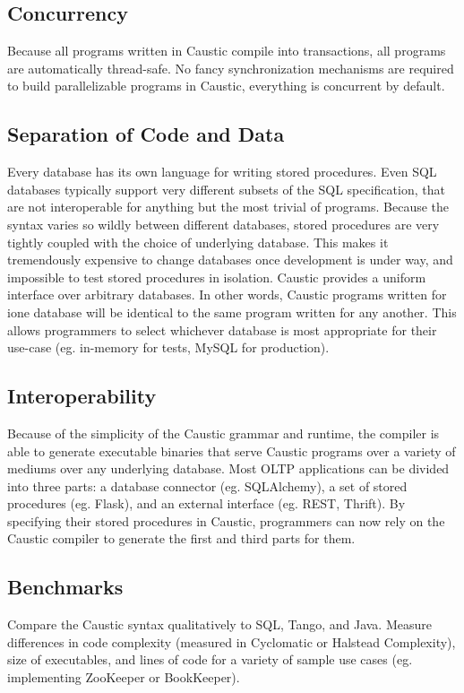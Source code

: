 \documentclass[12pt]{article}
\begin{document}
\subsection{Concurrency}
Because all programs written in Caustic compile into transactions, all programs are automatically thread-safe. No fancy synchronization mechanisms are required to build parallelizable programs in Caustic, everything is concurrent by default.

\subsection{Separation of Code and Data}
Every database has its own language for writing stored procedures. Even SQL databases typically support very different subsets of the SQL specification, that are not interoperable for anything but the most trivial of programs.  Because the syntax varies so wildly between different databases, stored procedures are very tightly coupled with the choice of underlying database. This makes it tremendously expensive to change databases once development is under way, and impossible to test stored procedures in isolation. Caustic provides a uniform interface over arbitrary databases. In other words, Caustic programs written for ione database will be identical to the same program written for any another. This allows programmers to select whichever database is most appropriate for their use-case (eg. in-memory for tests, MySQL for production). 

\subsection{Interoperability}
Because of the simplicity of the Caustic grammar and runtime, the compiler is able to generate executable binaries that serve Caustic programs over a variety of mediums over any underlying database. Most OLTP applications can be divided into three parts: a database connector (eg. SQLAlchemy), a set of stored procedures (eg. Flask), and an external interface (eg. REST, Thrift). By specifying their stored procedures in Caustic, programmers can now rely on the Caustic compiler to generate the first and third parts for them. 

\subsection{Benchmarks}
Compare the Caustic syntax qualitatively to SQL, Tango, and Java. Measure differences in code complexity (measured in Cyclomatic or Halstead Complexity), size of executables, and lines of code for a variety of sample use cases (eg. implementing ZooKeeper or BookKeeper). 
\end{document}
